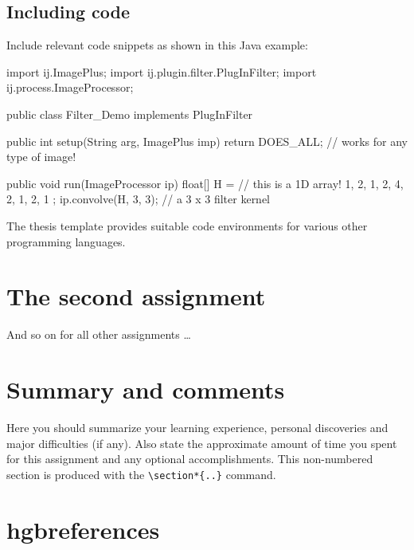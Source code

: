 \documentclass[language=english,titlepage=false,smartquotes=true]{hgbreport}
\begin{document}
\subsection{Including code}

Include relevant code snippets as shown in this Java example:
%
\begin{JavaCode}[numbers=none]
import ij.ImagePlus;
import ij.plugin.filter.PlugInFilter;
import ij.process.ImageProcessor;

public class Filter_Demo implements PlugInFilter {
	
	public int setup(String arg, ImagePlus imp) {
		return DOES_ALL;	// works for any type of image!
	}

	public void run(ImageProcessor ip) {
		float[] H = { 		// this is a 1D array!
				1, 2, 1,
				2, 4, 2,
				1, 2, 1 
		};
		ip.convolve(H, 3, 3);		// a 3 x 3 filter kernel
	}
}
\end{JavaCode}
%
The thesis template provides suitable code environments for various other
programming languages.


\section{The second assignment}

And so on for all other assignments \ldots


\section*{Summary and comments}

Here you should summarize your learning experience, personal discoveries and
major difficulties (if any). Also state the approximate amount of time you
spent for this assignment and any optional accomplishments. This non-numbered
section is produced with the \verb!\section*{..}! command.

  
\section*{hgbreferences}

\printbibliography[heading=noheader]

\end{document}
